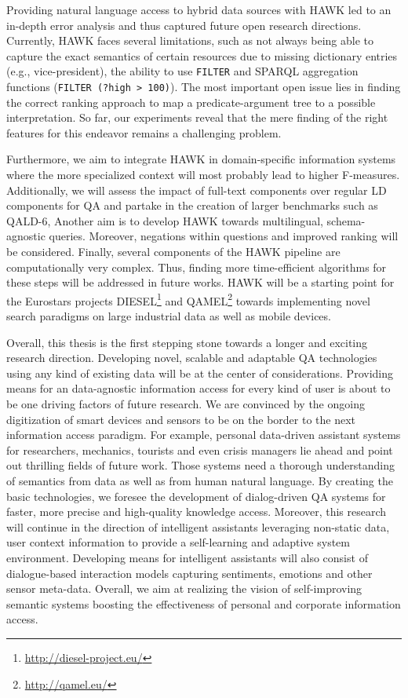 Providing natural language access to hybrid data sources with HAWK led to an in-depth error analysis and thus captured future open research directions.
Currently, HAWK faces several limitations, such as not always being able to capture the exact semantics of certain resources due to missing dictionary entries (e.g., vice-president), the ability to use \texttt{FILTER} and SPARQL aggregation functions (\texttt{FILTER (?high > 100)}). 
The most important open issue lies in finding the correct ranking approach to map a predicate-argument tree to a possible interpretation. 
So far, our experiments reveal that the mere finding of the right features for this endeavor remains a challenging problem. 

Furthermore, we aim to integrate HAWK in domain-specific information systems where the more specialized context will most probably lead to higher F-measures. 
Additionally, we will assess the impact of full-text components over regular LD components for \ac{QA} and partake in the creation of larger benchmarks such as \ac{QALD}-6,
Another aim is to develop HAWK towards multilingual, schema-agnostic queries.
Moreover, negations within questions and improved ranking will  be considered. 
Finally, several components of the HAWK pipeline are computationally very complex. 
Thus, finding more time-efficient algorithms for these steps will be addressed in future works.
HAWK will be a starting point for the Eurostars projects DIESEL\footnote{\url{http://diesel-project.eu/}} and QAMEL\footnote{\url{http://qamel.eu/}} towards implementing novel search paradigms on large industrial data as well as mobile devices.

\bigskip

Overall, this thesis is the first stepping stone towards a longer and exciting research direction. 
Developing novel, scalable and adaptable \ac{QA} technologies using any kind of existing data will be at the center of considerations.
Providing means for an data-agnostic information access for every kind of user is about to be one driving factors of future research. 
We are convinced by the ongoing digitization of smart devices and sensors to be on the border to the next information access paradigm.  
For example, personal data-driven assistant systems for researchers, mechanics, tourists and even crisis managers lie  ahead and point out thrilling fields of future work.
Those systems need a thorough understanding of semantics from data as well as from human natural language. 
By creating the basic technologies, we foresee the development of dialog-driven \ac{QA} systems for faster, more precise and high-quality knowledge access.
Moreover, this research will continue in the direction of intelligent assistants leveraging non-static data, user context information to provide a self-learning and adaptive system environment.
Developing means for intelligent assistants will also consist of dialogue-based interaction models capturing sentiments, emotions and other sensor meta-data.
Overall, we aim at realizing the vision of self-improving semantic systems boosting the effectiveness of personal and corporate information access.